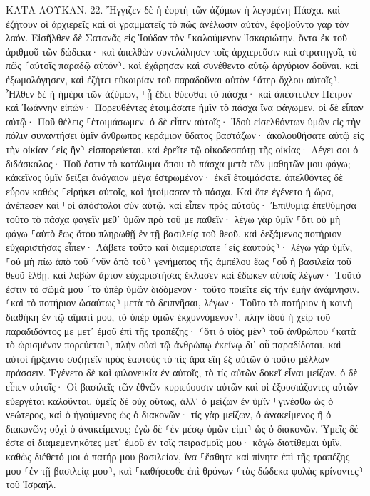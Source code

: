 \documentclass[twoside, 9pt]{extreport}
\begin{document}
ΚΑΤΑ ΛΟΥΚΑΝ.
22.
Ἤγγιζεν δὲ ἡ ἑορτὴ τῶν ἀζύμων ἡ λεγομένη Πάσχα. 
καὶ ἐζήτουν οἱ ἀρχιερεῖς καὶ οἱ γραμματεῖς τὸ πῶς ἀνέλωσιν αὐτόν, ἐφοβοῦντο γὰρ τὸν λαόν. 
Εἰσῆλθεν δὲ Σατανᾶς εἰς Ἰούδαν τὸν ⸀καλούμενον Ἰσκαριώτην, ὄντα ἐκ τοῦ ἀριθμοῦ τῶν δώδεκα· 
καὶ ἀπελθὼν συνελάλησεν τοῖς ἀρχιερεῦσιν καὶ στρατηγοῖς τὸ πῶς ⸂αὐτοῖς παραδῷ αὐτόν⸃. 
καὶ ἐχάρησαν καὶ συνέθεντο αὐτῷ ἀργύριον δοῦναι. 
καὶ ἐξωμολόγησεν, καὶ ἐζήτει εὐκαιρίαν τοῦ παραδοῦναι αὐτὸν ⸂ἄτερ ὄχλου αὐτοῖς⸃. 
Ἦλθεν δὲ ἡ ἡμέρα τῶν ἀζύμων, ⸀ᾗ ἔδει θύεσθαι τὸ πάσχα· 
καὶ ἀπέστειλεν Πέτρον καὶ Ἰωάννην εἰπών· Πορευθέντες ἑτοιμάσατε ἡμῖν τὸ πάσχα ἵνα φάγωμεν. 
οἱ δὲ εἶπαν αὐτῷ· Ποῦ θέλεις ⸀ἑτοιμάσωμεν. 
ὁ δὲ εἶπεν αὐτοῖς· Ἰδοὺ εἰσελθόντων ὑμῶν εἰς τὴν πόλιν συναντήσει ὑμῖν ἄνθρωπος κεράμιον ὕδατος βαστάζων· ἀκολουθήσατε αὐτῷ εἰς τὴν οἰκίαν ⸂εἰς ἣν⸃ εἰσπορεύεται. 
καὶ ἐρεῖτε τῷ οἰκοδεσπότῃ τῆς οἰκίας· Λέγει σοι ὁ διδάσκαλος· Ποῦ ἐστιν τὸ κατάλυμα ὅπου τὸ πάσχα μετὰ τῶν μαθητῶν μου φάγω; 
κἀκεῖνος ὑμῖν δείξει ἀνάγαιον μέγα ἐστρωμένον· ἐκεῖ ἑτοιμάσατε. 
ἀπελθόντες δὲ εὗρον καθὼς ⸀εἰρήκει αὐτοῖς, καὶ ἡτοίμασαν τὸ πάσχα. 
Καὶ ὅτε ἐγένετο ἡ ὥρα, ἀνέπεσεν καὶ ⸀οἱ ἀπόστολοι σὺν αὐτῷ. 
καὶ εἶπεν πρὸς αὐτούς· Ἐπιθυμίᾳ ἐπεθύμησα τοῦτο τὸ πάσχα φαγεῖν μεθ᾽ ὑμῶν πρὸ τοῦ με παθεῖν· 
λέγω γὰρ ὑμῖν ⸀ὅτι οὐ μὴ φάγω ⸀αὐτὸ ἕως ὅτου πληρωθῇ ἐν τῇ βασιλείᾳ τοῦ θεοῦ. 
καὶ δεξάμενος ποτήριον εὐχαριστήσας εἶπεν· Λάβετε τοῦτο καὶ διαμερίσατε ⸂εἰς ἑαυτούς⸃· 
λέγω γὰρ ὑμῖν, ⸀οὐ μὴ πίω ἀπὸ τοῦ ⸂νῦν ἀπὸ τοῦ⸃ γενήματος τῆς ἀμπέλου ἕως ⸀οὗ ἡ βασιλεία τοῦ θεοῦ ἔλθῃ. 
καὶ λαβὼν ἄρτον εὐχαριστήσας ἔκλασεν καὶ ἔδωκεν αὐτοῖς λέγων· Τοῦτό ἐστιν τὸ σῶμά μου ⸂τὸ ὑπὲρ ὑμῶν διδόμενον· τοῦτο ποιεῖτε εἰς τὴν ἐμὴν ἀνάμνησιν. 
⸂καὶ τὸ ποτήριον ὡσαύτως⸃ μετὰ τὸ δειπνῆσαι, λέγων· Τοῦτο τὸ ποτήριον ἡ καινὴ διαθήκη ἐν τῷ αἵματί μου, τὸ ὑπὲρ ὑμῶν ἐκχυννόμενον⸃. 
πλὴν ἰδοὺ ἡ χεὶρ τοῦ παραδιδόντος με μετ᾽ ἐμοῦ ἐπὶ τῆς τραπέζης· 
⸂ὅτι ὁ υἱὸς μὲν⸃ τοῦ ἀνθρώπου ⸂κατὰ τὸ ὡρισμένον πορεύεται⸃, πλὴν οὐαὶ τῷ ἀνθρώπῳ ἐκείνῳ δι᾽ οὗ παραδίδοται. 
καὶ αὐτοὶ ἤρξαντο συζητεῖν πρὸς ἑαυτοὺς τὸ τίς ἄρα εἴη ἐξ αὐτῶν ὁ τοῦτο μέλλων πράσσειν. 
Ἐγένετο δὲ καὶ φιλονεικία ἐν αὐτοῖς, τὸ τίς αὐτῶν δοκεῖ εἶναι μείζων. 
ὁ δὲ εἶπεν αὐτοῖς· Οἱ βασιλεῖς τῶν ἐθνῶν κυριεύουσιν αὐτῶν καὶ οἱ ἐξουσιάζοντες αὐτῶν εὐεργέται καλοῦνται. 
ὑμεῖς δὲ οὐχ οὕτως, ἀλλ᾽ ὁ μείζων ἐν ὑμῖν ⸀γινέσθω ὡς ὁ νεώτερος, καὶ ὁ ἡγούμενος ὡς ὁ διακονῶν· 
τίς γὰρ μείζων, ὁ ἀνακείμενος ἢ ὁ διακονῶν; οὐχὶ ὁ ἀνακείμενος; ἐγὼ δὲ ⸂ἐν μέσῳ ὑμῶν εἰμι⸃ ὡς ὁ διακονῶν. 
Ὑμεῖς δέ ἐστε οἱ διαμεμενηκότες μετ᾽ ἐμοῦ ἐν τοῖς πειρασμοῖς μου· 
κἀγὼ διατίθεμαι ὑμῖν, καθὼς διέθετό μοι ὁ πατήρ μου βασιλείαν, 
ἵνα ⸀ἔσθητε καὶ πίνητε ἐπὶ τῆς τραπέζης μου ⸂ἐν τῇ βασιλείᾳ μου⸃, καὶ ⸀καθήσεσθε ἐπὶ θρόνων ⸂τὰς δώδεκα φυλὰς κρίνοντες⸃ τοῦ Ἰσραήλ. 
\end{document}
